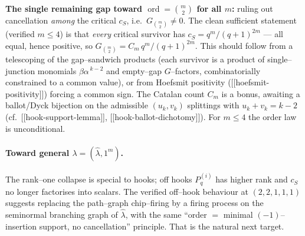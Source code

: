 \documentclass[11pt]{article}
\theoremstyle{definition}
\DeclareMathOperator{\ord}{ord}
\newcommand{\Pq}{P_{q}}
\newcommand{\la}{\lambda}
\begin{document}
\textbf{The single remaining gap toward $\ord=\binom m2$ for all $m$:} ruling out
cancellation \emph{among} the critical $c_S$, i.e.\ $G_{\binom m2}\ne0$. The clean
sufficient statement (verified $m\le4$) is that \emph{every} critical survivor has
$c_S=q^m/(q+1)^{2m}$ --- all equal, hence positive, so
$G_{\binom m2}=C_m\,q^m/(q+1)^{2m}$. This should follow from a telescoping of the
gap--sandwich products (each survivor is a product of single--junction monomials
$\beta\alpha^{\,k-2}$ and empty--gap $G$--factors, combinatorially constrained to a
common value), or from Hoefsmit positivity ([[hoefsmit-positivity]]) forcing a common
sign. The Catalan count $C_m$ is a bonus, awaiting a ballot/Dyck bijection on the
admissible $(u_k,v_k)$ splittings with $u_k+v_k=k-2$ (cf.\ [[hook-support-lemma]],
[[hook-ballot-dichotomy]]). For $m\le4$ the order law is unconditional.

\paragraph{Toward general $\la=(\hat\la,1^m)$.} The rank--one collapse is special to
hooks; off hooks $\Pq^{(i)}$ has higher rank and $c_S$ no longer factorises into
scalars. The verified off--hook behaviour at $(2,2,1,1,1)$ suggests replacing the
path--graph chip--firing by a firing process on the seminormal branching graph of
$\hat\la$, with the same ``order $=$ minimal $(-1)$--insertion support, no
cancellation'' principle. That is the natural next target.
\end{document}
